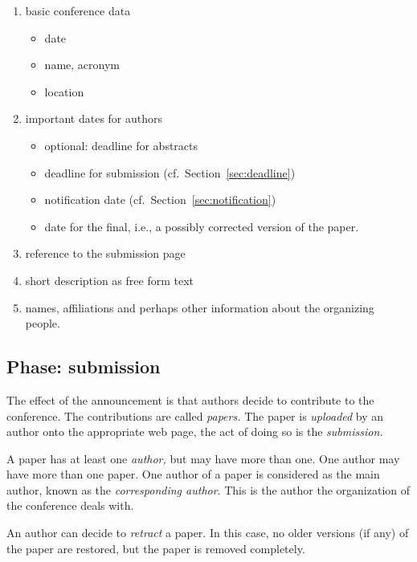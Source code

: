 \begin{enumerate}
\item basic conference data
  \begin{itemize}
  \item date
  \item name, acronym
  \item location
  \end{itemize}
\item important dates for authors
  \begin{itemize}
  \item optional: deadline for abstracts
  \item deadline for submission (cf.\ Section~\ref{sec:deadline})
  \item notification date (cf.\ Section~\ref{sec:notification})
  \item date for the final, i.e., a possibly corrected version of the
    paper.


  \end{itemize}
\item reference to the submission page
\item short description as free form text
\item names, affiliations and perhaps other information about the
  organizing people.
\end{enumerate}



\subsection{Phase: submission}
\label{sec:submission}

The effect of the announcement is that authors decide to contribute to the
conference. The contributions are called \emph{papers.} The paper is
\emph{uploaded} by an author onto the appropriate web page, the act of doing
so is the \emph{submission.} 

A paper has at least one \emph{author,} but may have more than one.  One
author may have more than one paper. One author of a paper is considered as
the main author, known as the \emph{corresponding author}. This is the
author the organization of the conference deals with. 

An author can decide to \emph{retract} a paper. In this case, no older
versions (if any) of the paper are restored, but the paper is removed
completely.





